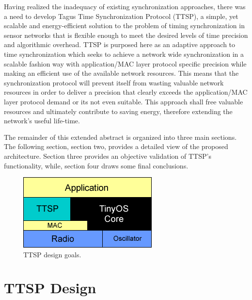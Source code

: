 \documentclass[11pt,a4]{article}
\begin{document}
\begin{multicols}{2}
Having realized the inadequacy of existing synchronization approaches, there was a need to develop Tagus Time Synchronization Protocol (TTSP), a simple, yet scalable and energy-efficient solution to the problem of timing synchronization in sensor networks that is flexible enough to meet the desired levels of time precision and algorithmic overhead. TTSP is purposed here as an adaptive approach to time synchronization which seeks to achieve a network wide synchronization in a scalable fashion way with application/MAC layer protocol specific precision while making an efficient use of the available network resources. This means that the synchronization protocol will prevent itself from wasting valuable network resources in order to deliver a precision that clearly exceeds the application/MAC layer protocol demand or its not even suitable. This approach shall free valuable resources and ultimately contribute to saving energy, therefore extending the network's useful life-time.

The remainder of this extended abstract is organized into three main sections. The following section, section two, provides a detailed view of the proposed architecture. Section three provides an objective validation of TTSP's functionality, while, section four draws some final conclusions.

\begin{figure}[!htb]
\begin{center}
\includegraphics[scale=0.5]{./images/02-ttsp-hwsf_arch.png}
\end{center}
\caption{TTSP design goals.}
\label{designgoals}
\end{figure}

\section{TTSP Design}


\end{multicols}
\end{document}
